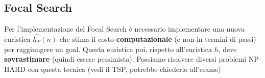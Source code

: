 \subsection{Focal Search}
Per l'implementazione del Focal Search è necessario implementare una nuova euristica $\hat{h_F}(n)$ che stima il costo \textbf{computazionale} (e non in termini di passi)
per raggiungere un goal. Questa euristica poi, rispetto all'euristica $h$, deve \textbf{sovrastimare} (quindi essere pessimista).
Possiamo risolvere diversi problemi NP-HARD con questa tecnica (vedi il TSP, potrebbe chiederlo all'esame)
